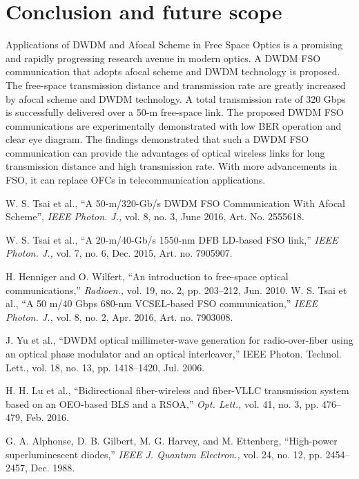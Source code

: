 \documentclass[hidelinks, 12pt]{report}
\begin{document}
\chapter{Conclusion and future scope}
\justify
Applications of DWDM and Afocal Scheme in Free Space Optics is a promising and rapidly progressing research avenue in modern optics. A DWDM FSO communication that adopts afocal scheme and DWDM technology is proposed.
The free-space transmission distance and transmission rate are greatly increased by afocal
scheme and DWDM technology. A total transmission rate of 320 Gbps is successfully delivered
over a 50-m free-space link. The proposed DWDM FSO communications are experimentally
demonstrated with low BER operation and clear eye diagram. The findings demonstrated that
such a DWDM FSO communication can provide the advantages of optical wireless links for long
transmission distance and high transmission rate. With more advancements in FSO, it can replace OFCs in telecommunication applications.\\
\pagebreak

\begin{thebibliography}{1}
 W. S. Tsai et al., “A 50-m/320-Gb/s DWDM FSO Communication With Afocal Scheme”, \textit{IEEE Photon. J.,} vol. 8, no. 3, June 2016, Art. No. 2555618.

 W. S. Tsai et al., “A 20-m/40-Gb/s 1550-nm DFB LD-based FSO link,” \textit{IEEE Photon. J.,} vol. 7, no. 6, Dec. 2015,
Art. no. 7905907.
 
H. Henniger and O. Wilfert, “An introduction to free-space optical communications,” \textit{Radioen.,} vol. 19, no. 2,
pp. 203–212, Jun. 2010.
W. S. Tsai et al., “A 50 m/40 Gbps 680-nm VCSEL-based FSO communication,” \textit{IEEE Photon. J., }vol. 8, no. 2,
Apr. 2016, Art. no. 7903008.


 J. Yu et al., “DWDM optical millimeter-wave generation for radio-over-fiber using an optical phase modulator and an
optical interleaver,” IEEE Photon. Technol. Lett., vol. 18, no. 13, pp. 1418–1420, Jul. 2006.


 H. H. Lu et al., “Bidirectional fiber-wireless and fiber-VLLC transmission system based on an OEO-based BLS and a
RSOA,” \textit{Opt. Lett., }vol. 41, no. 3, pp. 476–479, Feb. 2016.

\bibitem{}G. A. Alphonse, D. B. Gilbert, M. G. Harvey, and M. Ettenberg, “High-power superluminescent diodes,” \textit{IEEE J.
Quantum Electron.,} vol. 24, no. 12, pp. 2454–2457, Dec. 1988.




\end{thebibliography}
\end{document}
